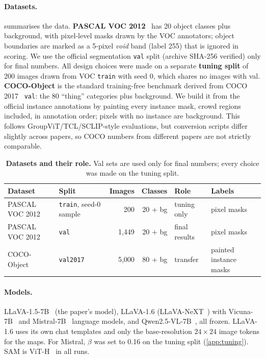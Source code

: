 \documentclass{article}
\begin{document}
\paragraph{Datasets.}  summarises the data. \textbf{PASCAL VOC
2012}~\citep{everingham2010pascal} has 20 object classes plus background, with pixel-level masks drawn
by the VOC annotators; object boundaries are marked as a 5-pixel \emph{void} band (label 255) that is
ignored in scoring. We use the official segmentation \texttt{val} split (archive SHA-256 verified) only
for final numbers. All design choices were made on a separate \textbf{tuning split} of 200 images drawn
from VOC \texttt{train} with seed 0, which shares no images with val. \textbf{COCO-Object} is the
standard training-free benchmark derived from COCO 2017~\citep{lin2014coco} \texttt{val}: the 80
``thing'' categories plus background. We build it from the official instance annotations by painting
every instance mask, crowd regions included, in annotation order; pixels with no instance are
background. This follows GroupViT/TCL/SCLIP-style evaluations, but conversion scripts differ slightly
across papers, so COCO numbers from different papers are not strictly comparable.

\begin{table}[t]
  \centering
  \caption{\textbf{Datasets and their role.} Val sets are used only for final numbers; every choice
  was made on the tuning split.}
  \label{tab:datasets}
  \small
  \begin{tabular}{@{}llrrll@{}}
    \toprule
    \textbf{Dataset} & \textbf{Split} & \textbf{Images} & \textbf{Classes} & \textbf{Role} & \textbf{Labels}\\
    \midrule
    PASCAL VOC 2012 & \texttt{train}, seed-0 sample & 200   & 20 + bg & tuning only    & pixel masks\\
    PASCAL VOC 2012 & \texttt{val}                  & 1,449 & 20 + bg & final results  & pixel masks\\
    COCO-Object     & \texttt{val2017}              & 5,000 & 80 + bg & transfer       & painted instance masks\\
    \bottomrule
  \end{tabular}
\end{table}

\paragraph{Models.} LLaVA-1.5-7B~\citep{liu2024improved} (the paper's model), LLaVA-1.6
(LLaVA-NeXT~\citep{liu2024llavanext}) with Vicuna-7B~\citep{chiang2023vicuna} and
Mistral-7B~\citep{jiang2023mistral} language models, and Qwen2.5-VL-7B~\citep{bai2025qwen25vl}, all
frozen. LLaVA-1.6 uses its own chat templates and only the base-resolution $24\times24$ image tokens
for the maps. For Mistral, $\beta$ was set to 0.16 on the tuning split (\cref{app:tuning}). SAM is
ViT-H~\citep{kirillov2023sam} in all runs.
\end{document}
